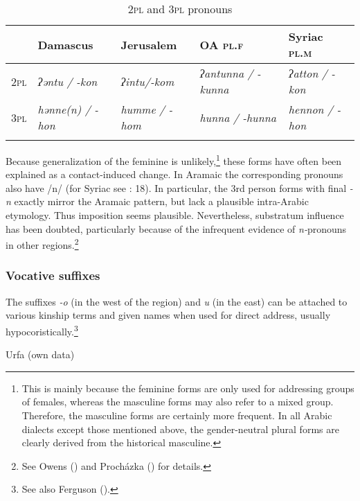 \documentclass[output=paper]{langsci/langscibook}
\begin{document}
\begin{table}
\begin{tabularx}{\textwidth}{Xllll}
\lsptoprule
&    Damascus &   Jerusalem &    OA \textsc{pl.f} & Syriac \textsc{pl.m}\\
\midrule 
\textsc{2pl} & \textit{ʔəntu} \textit{/} \textit{-kon} & \textit{ʔintu}\textit{/}\textit{-kom} & \textit{ʔantunna} \textit{/} \textit{-kunna} & \textit{ʔatton} \textit {/} \textit{-kon}\\
\textsc{3pl} & \textit{hənne(n)} \textit{/} \textit{-hon} & \textit{humme} \textit{/} \textit{-hom} & \textit{hunna} \textit{/} \textit{-hunna} & \textit{hennon} \textit{/} \textit{-hon}\\
\lspbottomrule
\end{tabularx}

\caption{\textsc{2pl} and \textsc{3pl} pronouns}
\label{tab:prochazka:2}
\end{table}

Because generalization of the feminine is unlikely,\footnote{This is mainly because the feminine forms are only used for addressing groups of females, whereas the masculine forms may also refer to a mixed group. Therefore, the masculine forms are certainly more frequent. In all Arabic dialects except those mentioned above, the gender-neutral plural forms are clearly derived from the historical masculine.} these forms have often been explained as a contact-induced change. In Aramaic the corresponding pronouns also have /n/ (for Syriac see \citealt{Muraoka2005}: 18). In particular, the 3rd person forms with final \textit{-n} exactly mirror the Aramaic pattern, but lack a plausible intra-Arabic etymology. Thus imposition seems plausible. Nevertheless, substratum influence has been doubted, particularly because of the infrequent evidence of \textit{n-}pronouns in other regions.\footnote{See Owens (\citeyear[244--245]{Owens2006}) and Procházka (\citeyear[283--284]{Procházka2018Fertile}) for details.}\textsuperscript{} 

\subsubsection{Vocative suffixes}\label{hypocoristic}
The suffixes \textit{-o} (in the west of the region) and \textit{u} (in the east) can be attached to various kinship terms and given names when used for direct address, usually hypocoristically.\footnote{See also Ferguson (\citeyear[187]{Ferguson1997}).} 

\ea
Urfa (own data)
\end{document}
